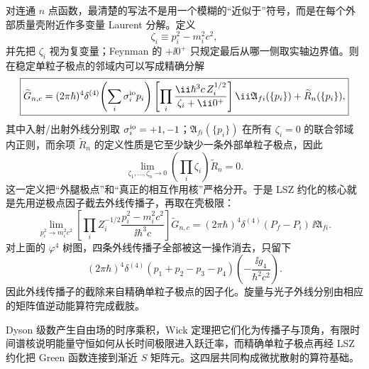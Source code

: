 对连通 $n$ 点函数，最清楚的写法不是用一个模糊的“近似于”符号，而是在每个外部质量壳附近作多变量 Laurent 分解。定义
\[
 \zeta_i\equiv p_i^2-m_i^2c^2,
\]
并先把 $\zeta_i$ 视为复变量；Feynman 的 $+\ii0^+$ 只规定最后从哪一侧取实轴边界值。则在稳定单粒子极点的邻域内可以写成精确分解
\begin{equation}
 \boxed{
 \widetilde G_{n,c}
 =
 (2\pi\hbar)^4\delta^{(4)}\!\left(\sum_i\sigma_i^{\rm io}p_i\right)
 \left[\prod_i
 \frac{\ii\hbar^3c\,Z_i^{1/2}}
 {\zeta_i+\ii0^+}\right]
 \ii\mathfrak A_{fi}(\{p_i\})
 +\widetilde R_n(\{p_i\}),}
 \label{eq:LSZ-factorization-r7}
\end{equation}
其中入射/出射外线分别取 $\sigma_i^{\rm io}=+1,-1$；$\mathfrak A_{fi}(\{p_i\})$ 在所有 $\zeta_i=0$ 的联合邻域内正则，而余项 $\widetilde R_n$ 的定义性质是它至少缺少一条外部单粒子极点，因此
\[
 \lim_{\zeta_1,\ldots,\zeta_n\to0}
 \left(\prod_i\zeta_i\right)\widetilde R_n=0.
\]
这一定义把“外腿极点”和“真正的相互作用核”严格分开。于是 LSZ 约化的核心就是先用逆极点因子截去外线传播子，再取在壳极限：
\begin{equation}
 \boxed{
 \lim_{p_i^2\to m_i^2c^2}
 \left[\prod_i
 Z_i^{-1/2}\frac{p_i^2-m_i^2c^2}{\ii\hbar^3c}\right]
 \widetilde G_{n,c}
 =(2\pi\hbar)^4\delta^{(4)}(P_f-P_i)\,\ii\mathfrak A_{fi}.}
 \label{eq:lsz-momentum-reduction-r7}
\end{equation}
对上面的 $\varphi^4$ 树图，四条外线传播子全部被这一操作消去，只留下
\begin{equation}
 \boxed{
 (2\pi\hbar)^4\delta^{(4)}(p_1+p_2-p_3-p_4)
 \left(-\frac{\ii g_4}{\hbar^2c^2}\right).}
 \label{eq:phi4-lsz-result-r7}
\end{equation}
因此外线传播子的截除来自精确单粒子极点的因子化。旋量与光子外线分别由相应的矩阵值逆动能算符完成截肢。

Dyson 级数产生自由场的时序乘积，Wick 定理把它们化为传播子与顶角，有限时间谱核说明能量守恒如何从长时间极限进入跃迁率，而精确单粒子极点再经 LSZ 约化把 Green 函数连接到渐近 $S$ 矩阵元。这四层共同构成微扰散射的算符基础。





